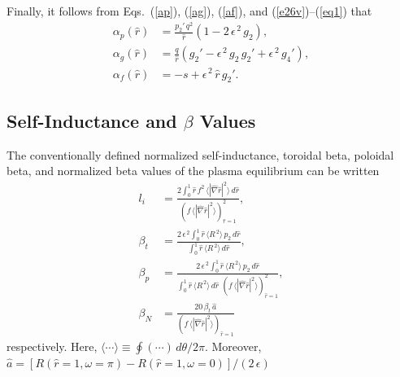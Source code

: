 \documentclass[12pt,prb,aps]{revtex4-1}
\begin{document}
Finally, it follows from Eqs.~(\ref{ap}), (\ref{ag}), (\ref{af}), and (\ref{e26v})--(\ref{eq1}) that
\begin{align}
\alpha_p(\hat{r}) &= \frac{p_2'\,q^2}{\hat{r}}\left(1-2\,\epsilon^{\,2}\,g_2\right),\\[0.5ex]
\alpha_g(\hat{r}) &= \frac{q}{\hat{r}}\left(g_2' -\epsilon^{\,2}\,g_2\,g_2'+\epsilon^{\,2}\,g_4'\right),\\[0.5ex]
\alpha_f(\hat{r}) &= -s + \epsilon^{\,2}\,\hat{r}\,g_2'.
\end{align}

\subsection{Self-Inductance and $\beta$ Values}
The conventionally defined normalized self-inductance, toroidal beta, poloidal beta, and normalized beta values of the plasma equilibrium 
can be written\,\cite{gs1}
\begin{align}
l_i&= \frac{2\int_0^1 \hat{r}\,f^2\,\langle |\hat{\nabla} \hat{r}|^2\rangle\,d\hat{r}}{(f\,\langle|\hat{\nabla} \hat{r}|^2\rangle)_{\hat{r}=1}^2},\\[0.5ex]
\beta_t &=  \frac{2\,\epsilon^{\,2}\int_0^1 \hat{r}\,\langle R^{\,2}\rangle\,p_2\,d\hat{r}}{\int_0^1 \hat{r}\,\langle R^{\,2}\rangle\,d\hat{r}},\\[0.5ex]
\beta_p &=  \frac{2\,\epsilon^{\,2}\int_0^1 \hat{r}\,\langle R^{\,2}\rangle\,p_2\,d\hat{r}}
{\int_0^1\hat{r}\,\langle R^{\,2}\rangle\,d\hat{r}\,\,(f\,\langle|\hat{\nabla} \hat{r}|^2\rangle)_{\hat{r}=1}^2},\\[0.5ex]
\beta_N &=  \frac{20\,\beta_t\,\hat{a}}
{(f\,\langle|\hat{\nabla} \hat{r}|^2\rangle)_{\hat{r}=1}}
\end{align}
respectively. Here, $\langle\cdots\rangle \equiv \oint (\cdots)\,d\theta/2\pi$. Moreover, 
$\hat{a}= [R(\hat{r}=1,\omega=\pi)-R(\hat{r}=1,\omega=0)]/(2\,\epsilon)$ 
\end{document}
